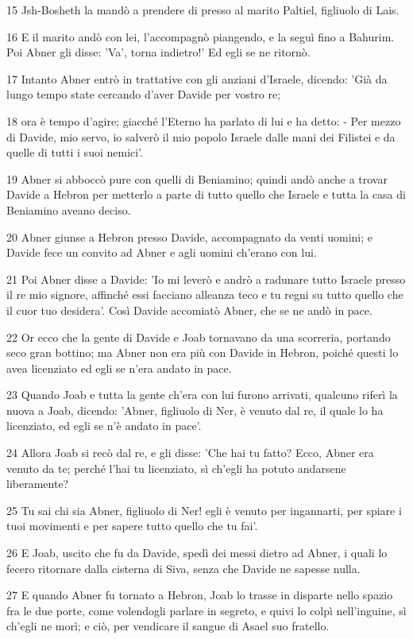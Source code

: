 \par 15 Jsh-Bosheth la mandò a prendere di presso al marito Paltiel, figliuolo di Lais.
\par 16 E il marito andò con lei, l'accompagnò piangendo, e la seguì fino a Bahurim. Poi Abner gli disse: 'Va', torna indietro!' Ed egli se ne ritornò.
\par 17 Intanto Abner entrò in trattative con gli anziani d'Israele, dicendo: 'Già da lungo tempo state cercando d'aver Davide per vostro re;
\par 18 ora è tempo d'agire; giacché l'Eterno ha parlato di lui e ha detto: - Per mezzo di Davide, mio servo, io salverò il mio popolo Israele dalle mani dei Filistei e da quelle di tutti i suoi nemici'.
\par 19 Abner si abboccò pure con quelli di Beniamino; quindi andò anche a trovar Davide a Hebron per metterlo a parte di tutto quello che Israele e tutta la casa di Beniamino aveano deciso.
\par 20 Abner giunse a Hebron presso Davide, accompagnato da venti uomini; e Davide fece un convito ad Abner e agli uomini ch'erano con lui.
\par 21 Poi Abner disse a Davide: 'Io mi leverò e andrò a radunare tutto Israele presso il re mio signore, affinché essi facciano alleanza teco e tu regni su tutto quello che il cuor tuo desidera'. Così Davide accomiatò Abner, che se ne andò in pace.
\par 22 Or ecco che la gente di Davide e Joab tornavano da una scorreria, portando seco gran bottino; ma Abner non era più con Davide in Hebron, poiché questi lo avea licenziato ed egli se n'era andato in pace.
\par 23 Quando Joab e tutta la gente ch'era con lui furono arrivati, qualcuno riferì la nuova a Joab, dicendo: 'Abner, figliuolo di Ner, è venuto dal re, il quale lo ha licenziato, ed egli se n'è andato in pace'.
\par 24 Allora Joab si recò dal re, e gli disse: 'Che hai tu fatto? Ecco, Abner era venuto da te; perché l'hai tu licenziato, sì ch'egli ha potuto andarsene liberamente?
\par 25 Tu sai chi sia Abner, figliuolo di Ner! egli è venuto per ingannarti, per spiare i tuoi movimenti e per sapere tutto quello che tu fai'.
\par 26 E Joab, uscito che fu da Davide, spedì dei messi dietro ad Abner, i quali lo fecero ritornare dalla cisterna di Siva, senza che Davide ne sapesse nulla.
\par 27 E quando Abner fu tornato a Hebron, Joab lo trasse in disparte nello spazio fra le due porte, come volendogli parlare in segreto, e quivi lo colpì nell'inguine, sì ch'egli ne morì; e ciò, per vendicare il sangue di Asael suo fratello.
